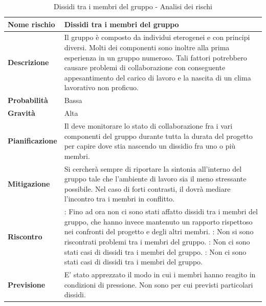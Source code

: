 \documentclass[12pt,a4paper]{article}
\begin{document}
\begin{table}[H]
	\begin{center}
		\begin{tabular}{p{} p{}}
			\toprule
			\textbf{Nome rischio} & \textbf{Dissidi tra i membri del gruppo} \\
			\midrule
			\midrule
			\textbf{Descrizione} & Il gruppo è composto da individui eterogenei e con principi diversi. Molti dei componenti sono inoltre alla prima esperienza in un gruppo numeroso. Tali fattori potrebbero causare problemi di collaborazione con conseguente appesantimento del carico di lavoro e la nascita di un clima lavorativo non proficuo. \\
			\midrule
			\textbf{Probabilità} & Bassa \\
			\midrule
			\textbf{Gravità} & Alta \\
			\midrule
			\textbf{Pianificazione} & Il \PM{} deve monitorare lo stato di collaborazione fra i vari componenti del gruppo durante tutta la durata del progetto per capire dove stia nascendo un dissidio fra uno o più membri. \\
			\midrule
			\textbf{Mitigazione} & Si cercherà sempre di riportare la sintonia all’interno del gruppo tale che l’ambiente di lavoro sia il meno stressante possibile. Nel caso di forti contrasti, il \PM{} dovrà mediare l’incontro tra i membri in conflitto. \\
			\midrule
			\textbf{Riscontro} & 
                \textbf{\FA{}}: Fino ad ora non ci sono stati affatto dissidi tra i membri del gruppo, 
                    che hanno invece mantenuto un rapporto rispettoso nei confronti 
                    del progetto e degli altri membri. \newline
                \textbf{\FAD{}}: Non si sono riscontrati problemi tra i membri del gruppo. \newline
                \textbf{\FPA{}}: Non ci sono stati casi di dissidi tra i membri del gruppo. \newline
                \textbf{\FPD{}}: Non ci sono stati casi di dissidi tra i membri del gruppo. \\
            \midrule
			\textbf{Previsione} & E' stato apprezzato il modo in cui i membri hanno reagito in condizioni di pressione. Non sono per cui previsti particolari dissidi. \\
			\bottomrule
		\end{tabular}
		\caption{Dissidi tra i membri del gruppo - Analisi dei rischi}
	\end{center}
\end{table}
\end{document}
